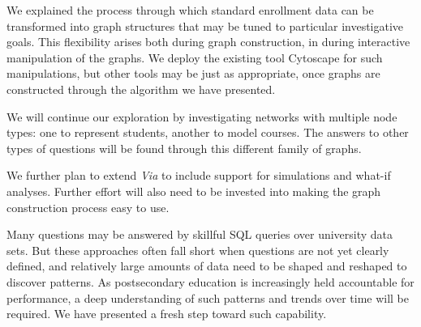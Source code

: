 \documentclass{sigchi}
\begin{document}
We explained the process through which standard enrollment data can be
transformed into graph structures that may be tuned to particular
investigative goals. This flexibility arises both during graph
construction, in during interactive manipulation of the
graphs. We deploy the existing tool Cytoscape for such
manipulations, but other tools may be just as appropriate, once graphs
are constructed through the algorithm we have presented.

We will continue our exploration by investigating networks with
multiple node types: one to represent students, another to model
courses. The answers to other types of questions will be found through
this different family of graphs. 

We further plan to extend {\em Via} to include support for simulations
and what-if analyses. Further effort will also need to be invested
into making the graph construction process easy to use. 

Many questions may be answered by skillful SQL queries over university
data sets. But these approaches often fall short when questions are
not yet clearly defined, and relatively large amounts of data need to
be shaped and reshaped to discover patterns. As postsecondary
education is increasingly held accountable for performance, a deep
understanding of such patterns and trends over time will be
required. We have presented a fresh step toward such capability.

\balance{}

{\small}
\end{document}
